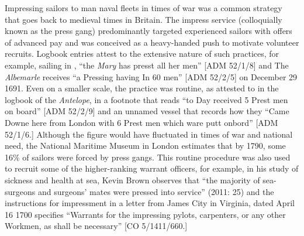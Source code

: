   Impressing sailors to man naval fleets in times of war was a common strategy that goes back to medieval times in Britain. The impress service (colloquially known as the press gang) predominantly targeted experienced sailors with offers of advanced pay and was conceived as a heavy-handed push to motivate volunteer recruits. Logbook entries attest to the extensive nature of such practices, for example, sailing in \citealt{March1691}, “the \textit{Mary} has presst all her men” [ADM 52/1/8] and The \textit{Albemarle} receives “a Pressing having In 60 men” [ADM 52/2/5] on December 29 1691. Even on a smaller scale, the practice was routine, as attested to in the logbook of the \textit{Antelope}, in a footnote that reads “to Day received 5 Prest men on board” [ADM 52/2/9] and an unnamed vessel that records how they “Came Downe here from London with 6 Prest men which ware putt onbord” [ADM 52/1/6.] Although the figure would have fluctuated in times of war and national need, the National Maritime Museum in London estimates that by 1790, some 16\% of sailors were forced by press gangs. This routine procedure was also used to recruit some of the higher-ranking warrant officers, for example, in his study of sickness and health at sea, Kevin Brown observes that “the majority of sea-surgeons and surgeons’ mates were pressed into service” (2011: 25) and the instructions for impressment in a letter from James City in Virginia, dated April 16 1700 specifies “Warrants for the impressing pylots, carpenters, or any other Workmen, as shall be necessary” [CO 5/1411/660.]


